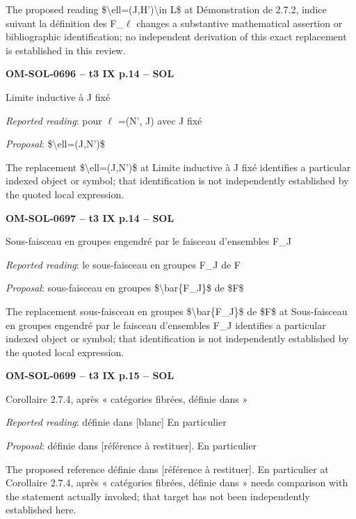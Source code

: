 The proposed reading \$\textbackslash{}ell=\allowbreak (J,H')\textbackslash{}in L\$ at Démonstration de 2.7.2, indice suivant la définition des F\_\ensuremath{\ell} changes a substantive mathematical assertion or bibliographic identification; no independent derivation of this exact replacement is established in this review.\par
\par\noindent\textbf{OM-SOL-0696 -- t3 IX p.14 -- SOL}\par
Limite inductive à J fixé\par
\emph{Reported reading}: pour \ensuremath{\ell} =\allowbreak  (N', J) avec J fixé\par
\emph{Proposal}: \$\textbackslash{}ell=\allowbreak (J,N')\$\par
The replacement \$\textbackslash{}ell=\allowbreak (J,N')\$ at Limite inductive à J fixé identifies a particular indexed object or symbol; that identification is not independently established by the quoted local expression.\par
\par\noindent\textbf{OM-SOL-0697 -- t3 IX p.14 -- SOL}\par
Sous-faisceau en groupes engendré par le faisceau d'ensembles F\_J\par
\emph{Reported reading}: le sous-faisceau en groupes F\_J de F\par
\emph{Proposal}: sous-faisceau en groupes \$\textbackslash{}bar\{F\_J\}\$ de \$F\$\par
The replacement sous-faisceau en groupes \$\textbackslash{}bar\{F\_J\}\$ de \$F\$ at Sous-faisceau en groupes engendré par le faisceau d'ensembles F\_J identifies a particular indexed object or symbol; that identification is not independently established by the quoted local expression.\par
\par\noindent\textbf{OM-SOL-0699 -- t3 IX p.15 -- SOL}\par
Corollaire 2.7.4, après « catégories fibrées, définie dans »\par
\emph{Reported reading}: définie dans [blanc] En particulier\par
\emph{Proposal}: définie dans [référence à restituer]. En particulier\par
The proposed reference définie dans [référence à restituer]. En particulier at Corollaire 2.7.4, après « catégories fibrées, définie dans » needs comparison with the statement actually invoked; that target has not been independently established here.\par
